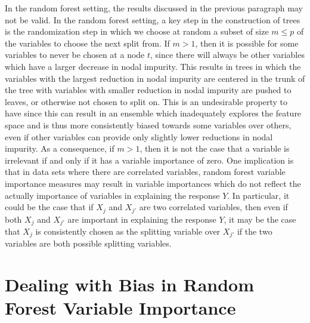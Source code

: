 \documentclass[12pt,twoside]{reedthesis}
\theoremstyle{definition}
\theoremstyle{definition}
\theoremstyle{definition}
\theoremstyle{remark}
\begin{document}
In the random forest setting, the results discussed in the previous
paragraph may not be valid. In the random forest setting, a key step in
the construction of trees is the randomization step in which we choose
at random a subset of size \(m\leq p\) of the variables to choose the
next split from. If \(m>1\), then it is possible for some variables to
never be chosen at a node \(t\), since there will always be other
variables which have a larger decrease in nodal impurity. This results
in trees in which the variables with the largest reduction in nodal
impurity are centered in the trunk of the tree with variables with
smaller reduction in nodal impurity are pushed to leaves, or otherwise
not chosen to split on. This is an undesirable property to have since
this can result in an ensemble which inadequately explores the feature
space and is thus more consistently biased towards some variables over
others, even if other variables can provide only slightly lower
reductions in nodal impurity. As a consequence, if \(m>1\), then it is
not the case that a variable is irrelevant if and only if it has a
variable importance of zero. One implication is that in data sets where
there are correlated variables, random forest variable importance
measures may result in variable importances which do not reflect the
actually importance of variables in explaining the response \(Y\). In
particular, it could be the case that if \(X_j\) and \(X_{j'}\) are two
correlated variables, then even if both \(X_j\) and \(X_{j'}\) are
important in explaining the response \(Y\), it may be the case that
\(X_j\) is consistently chosen as the splitting variable over \(X_{j'}\)
if the two variables are both possible splitting variables. \par

\section{Dealing with Bias in Random Forest Variable
Importance}\label{dealing-with-bias-in-random-forest-variable-importance}
\end{document}
